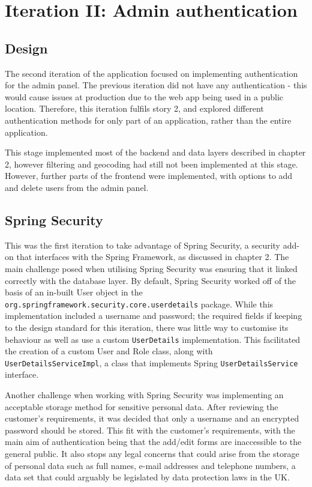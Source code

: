 \section{Iteration II: Admin authentication}
\subsection{Design}

The second iteration of the application focused on implementing authentication for the admin panel. The previous iteration did not have any authentication - this would cause issues at production due to the web app being used in a public location. Therefore, this iteration fulfils story 2, and explored different authentication methods for only part of an application, rather than the entire application.

This stage implemented most of the backend and data layers described in chapter 2, however filtering and geocoding had still not been implemented at this stage. However, further parts of the frontend were implemented, with options to add and delete users from the admin panel.

\subsection{Spring Security}

This was the first iteration to take advantage of Spring Security, a security add-on that interfaces with the Spring Framework, as discussed in chapter 2. The main challenge posed when utilising Spring Security was ensuring that it linked correctly with the database layer. By default, Spring Security worked off of the basis of an in-built User object in the \texttt{org.springframework.security.core.userdetails} package. While this implementation included a username and password; the required fields if keeping to the design standard for this iteration, there was little way to customise its behaviour as well as use a custom \texttt{UserDetails} implementation. This facilitated the creation of a custom User and Role class, along with \texttt{UserDetailsServiceImpl}, a class that implements Spring \texttt{UserDetailsService} interface.

Another challenge when working with Spring Security was implementing an acceptable storage method for sensitive personal data. After reviewing the customer's requirements, it was decided that only a username and an encrypted password should be stored. This fit with the customer's requirements, with the main aim of authentication being that the add/edit forms are inaccessible to the general public. It also stops any legal concerns that could arise from the storage of personal data such as full names, e-mail addresses and telephone numbers, a data set that could arguably be legislated by data protection laws in the UK\cite{dpa2018}.

